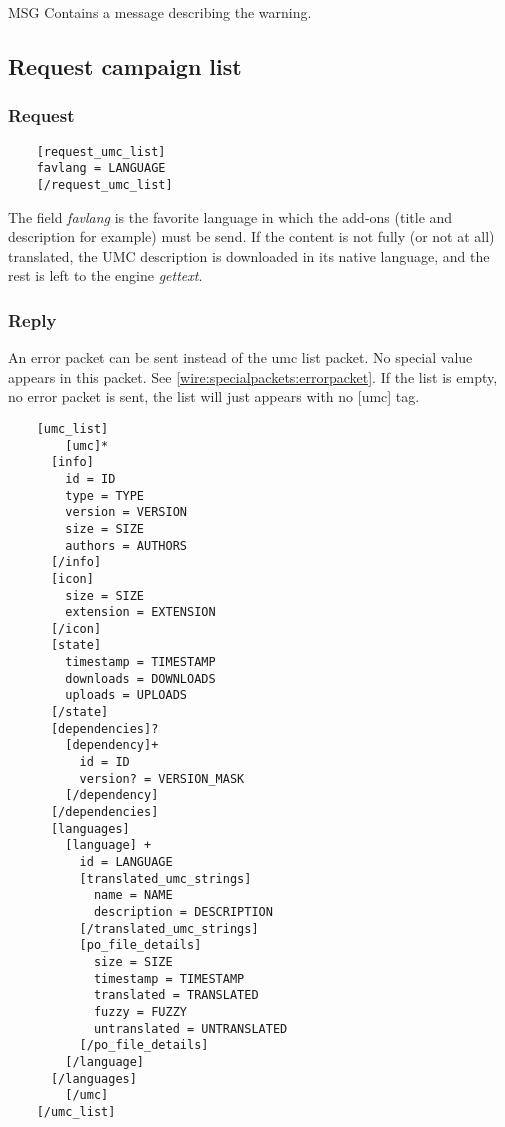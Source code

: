 \begin{description}
 \item MSG Contains a message describing the warning.
\end{description}

\subsection{Request campaign list}
\label{wire:request_campaign_list}

\subsubsection{Request}
\begin{lstlisting}
	[request_umc_list]
    favlang = LANGUAGE
	[/request_umc_list]
\end{lstlisting}

The field \textit{favlang} is the favorite language in which the add-ons (title and description for example) must be send. 
If the content is not fully (or not at all) translated,  the UMC description is downloaded in its native language, 
and the rest is left to the engine \textit{gettext}.
\newline
\subsubsection{Reply}

An error packet can be sent instead of the umc list packet. No special value appears in this packet. See \cref{wire:specialpackets:errorpacket}.
If the list is empty, no error packet is sent, the list will just appears with no [umc] tag.

\begin{lstlisting}
	[umc_list]
		[umc]*
      [info]
        id = ID
        type = TYPE
        version = VERSION
        size = SIZE
        authors = AUTHORS
      [/info]
      [icon]
        size = SIZE
        extension = EXTENSION
      [/icon]
      [state]
        timestamp = TIMESTAMP
        downloads = DOWNLOADS
        uploads = UPLOADS
      [/state]
      [dependencies]?
        [dependency]+
          id = ID
          version? = VERSION_MASK
        [/dependency]
      [/dependencies]
      [languages]
        [language] +
          id = LANGUAGE
          [translated_umc_strings]
            name = NAME
            description = DESCRIPTION
          [/translated_umc_strings]
          [po_file_details]
            size = SIZE
            timestamp = TIMESTAMP
            translated = TRANSLATED
            fuzzy = FUZZY
            untranslated = UNTRANSLATED
          [/po_file_details]
        [/language]
      [/languages]
		[/umc]
	[/umc_list]
\end{lstlisting}

